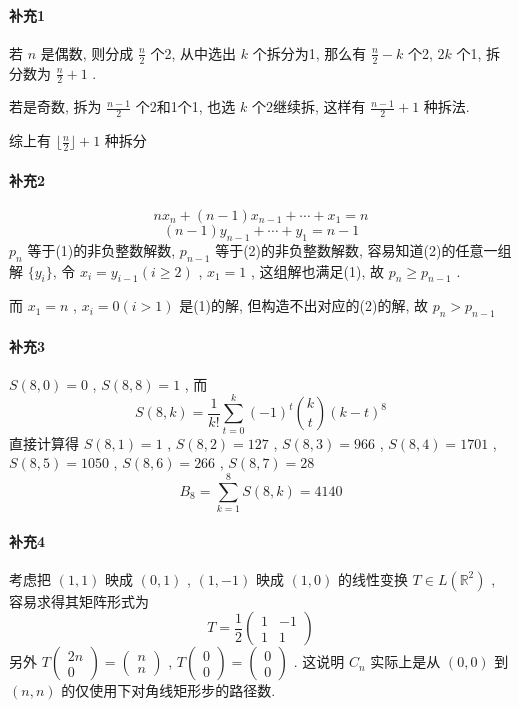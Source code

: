 \documentclass[a4paper, UTF8]{ctexart}				%
\begin{document}
    \paragraph{补充1}\quad 
        若 $n$ 是偶数, 则分成 $\frac{n}{2}$ 个2, 从中选出 $k$ 个拆分为1, 那么有 $\frac{n}{2}-k$ 个2, $2k$ 个1, 拆分数为 $\frac{n}{2}+1$ .

        若是奇数, 拆为 $\frac{n-1}{2}$ 个2和1个1, 也选 $k$ 个2继续拆, 这样有 $\frac{n-1}{2} + 1$ 种拆法.

        综上有 $\lfloor\frac{n}{2}\rfloor + 1$ 种拆分
    \paragraph{补充2}\quad 
        \begin{equation}
            nx_n+ (n-1)x_{n-1} + \cdots + x_1 = n
        \end{equation}
        \begin{equation}
            (n-1)y_{n-1} + \cdots + y_1 = n-1            
        \end{equation}
        $p_n$ 等于(1)的非负整数解数, $p_{n-1}$ 等于(2)的非负整数解数, 容易知道(2)的任意一组解 $\{y_i\}$, 令 $x_i=y_{i-1}(i \ge 2)$ , $x_1=1$ , 这组解也满足(1), 故 $p_n \ge p_{n-1}$ .
        
        而 $x_1=n$ , $x_i = 0(i>1)$ 是(1)的解, 但构造不出对应的(2)的解, 故 $p_n > p_{n-1}$

    \paragraph{补充3}\quad 
        $S(8,0) = 0$ , $S(8,8) =1$ , 而 
        \[
            S(8,k) = \frac{1}{k!} \sum^{k}_{t=0} (-1)^t {{k} \choose {t}}(k-t)^8
        \]
        直接计算得 $S(8,1) = 1$ , $S(8,2)= 127$ , $S(8,3) = 966$ , $S(8,4) = 1701$ , $S(8,5) = 1050$ , $S(8,6) = 266$ , $S(8,7) = 28$
        $$B_8 = \sum^{8}_{k=1} S(8,k) = 4140$$
        
    \paragraph{补充4}\quad 
        考虑把 $(1,1)$ 映成 $(0,1)$ , $(1,-1)$ 映成 $(1,0)$ 的线性变换 $T \in L(\mathbb{R}^2)$ , 容易求得其矩阵形式为 
        \[  
            T = \frac{1}{2}
            \begin{pmatrix}
                1 & -1\\
                1 & 1
            \end{pmatrix}
        \]
        另外 $T \begin{pmatrix}2n\\0\end{pmatrix} = \begin{pmatrix}n\\n\end{pmatrix}$ , $T \begin{pmatrix}0\\0\end{pmatrix} = \begin{pmatrix}0\\0\end{pmatrix}$ . 这说明 $C_n$ 实际上是从 $(0,0)$ 到 $(n,n)$ 的仅使用下对角线矩形步的路径数.
\end{document}
